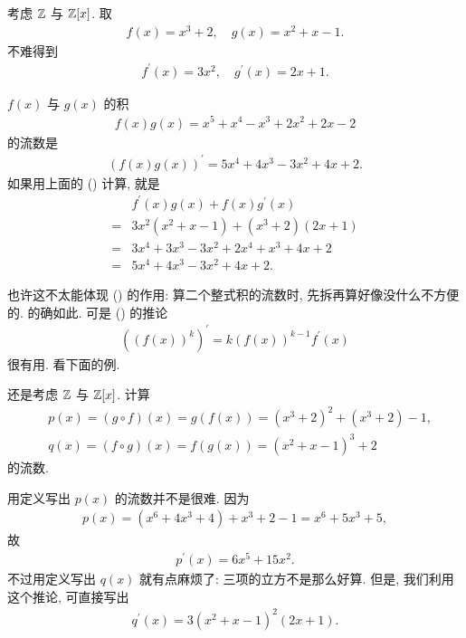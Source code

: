 \begin{example}
    考虑 $\mathbb{Z}$ 与 $\mathbb{Z}[x]$. 取
    \begin{align*}
        f(x) = x^3 + 2, \quad g(x) = x^2 + x - 1.
    \end{align*}
    不难得到
    \begin{align*}
        f^{\prime} (x) = 3x^2, \quad g^{\prime} (x) = 2x + 1.
    \end{align*}

    $f(x)$ 与 $g(x)$ 的积
    \begin{align*}
        f(x) g(x) = x^5 + x^4 - x^3 + 2x^2 + 2x - 2
    \end{align*}
    的流数是
    \begin{align*}
        (f(x) g(x))^{\prime} = 5x^4 + 4x^3 - 3x^2 + 4x + 2.
    \end{align*}
    如果用上面的 () 计算, 就是
    \begin{align*}
             & f^{\prime} (x) g(x) + f(x) g^{\prime} (x) \\
        = {} & 3x^2 (x^2 + x - 1) + (x^3 + 2) (2x + 1)   \\
        = {} & 3x^4 + 3x^3 - 3x^2 + 2x^4 + x^3 + 4x + 2  \\
        = {} & 5x^4 + 4x^3 - 3x^2 + 4x + 2.
    \end{align*}
\end{example}

也许这不太能体现 () 的作用: 算二个整式积的流数时, 先拆再算好像没什么不方便的. 的确如此. 可是 () 的推论
\begin{align*}
    ((f(x))^k)^{\prime} = k(f(x))^{k-1} f^{\prime}(x)
\end{align*}
很有用. 看下面的例.

\begin{example}
    还是考虑 $\mathbb{Z}$ 与 $\mathbb{Z}[x]$. 计算
    \begin{align*}
         & p(x) = (g \circ f) (x) = g(f(x)) = (x^3 + 2)^2 + (x^3 + 2) - 1, \\
         & q(x) = (f \circ g) (x) = f(g(x)) = (x^2 + x - 1)^3 + 2
    \end{align*}
    的流数.

    用定义写出 $p(x)$ 的流数并不是很难. 因为
    \begin{align*}
        p(x) = (x^6 + 4x^3 + 4) + x^3 + 2 - 1 = x^6 + 5x^3 + 5,
    \end{align*}
    故
    \begin{align*}
        p^{\prime} (x) = 6x^5 + 15x^2.
    \end{align*}
    不过用定义写出 $q(x)$ 就有点麻烦了: 三项的立方不是那么好算. 但是, 我们利用这个推论, 可直接写出
    \begin{align*}
        q^{\prime} (x) = 3(x^2 + x - 1)^2 (2x + 1).
    \end{align*}
\end{example}

